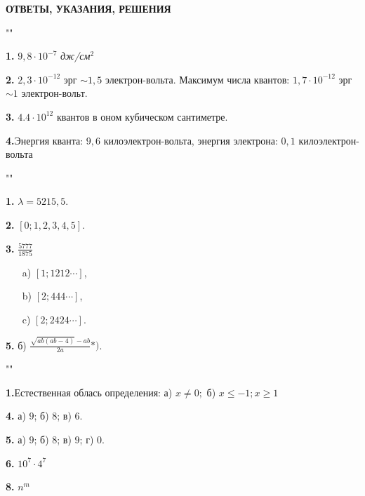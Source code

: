 \pagestyle{empty}
\begin{center}
\textbf{\large{ОТВЕТЫ, УКАЗАНИЯ, РЕШЕНИЯ}}
\end{center}
\begin{minipage}{0.45\textwidth}
\begin{center}

""

\end{center}
\textbf{1.} $9,8 \cdot 10^{-7}$ \textit{дж/см}$^2$


\textbf{2.} $2,3 \cdot 10^{-12}$ эрг $\sim 1,5$ электрон-вольта. Максимум числа квантов: $1,7 \cdot 10^{-12}$ эрг $\sim 1$ электрон-вольт.


\textbf{3.} $4.4 \cdot 10^{12}$ квантов в оном кубическом сантиметре.

\textbf{4.}Энергия кванта: $9,6$ килоэлектрон-вольта, энергия электрона: $0,1$ килоэлектрон-вольта

\begin{center}
""
\end{center}
\par\textbf{1.} $\lambda = 5215,5$.
\par\textbf{2.} $\left[0; 1, 2, 3, 4, 5\right]$.
\par\textbf{3.} $\frac{5777}{1875}$

\begin{itemize}
\item[a)] $\left[1; 1212\cdots\right]$,
\item[b)] $\left[2; 444\cdots\right]$,
\item[c)] $\left[2; 2424\cdots\right]$.
\end{itemize}

\textbf{5.} б) $\frac{\sqrt{ab(ab - 4)} - ab}{2a}*)$.

\begin{center}

""

\end{center}

 \textbf{1.}Естественная облась определения: а) $ x\ne 0;$ б) $x \le -1; x \ge 1$

 \textbf{4.} а) $9$; б) $8$; в) $6$.

\textbf{5.} а) $9$; б) $8$; в) $9$; г) $0$.

\textbf{6.} $10^7 \cdot 4^7$

\textbf{8.} $n^m$


\end{minipage}

